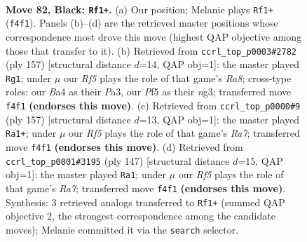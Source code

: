 \documentclass[11pt]{article}
\begin{document}
\clearpage

\begin{figure}[p]\centering
\begin{subfigure}{0.46\textwidth}\centering
\resizebox{\linewidth}{!}{%
\newchessgame
\chessboard[
  setfen={7R/P4k2/8/5p2/b4r2/8/8/7K b - - 0 82},
  showmover=false,
  pgfstyle=straightmove, color=movearrow, markmove={f4-f1}
]}
\caption{}
\end{subfigure}\hfill
\begin{subfigure}{0.46\textwidth}\centering
\resizebox{\linewidth}{!}{%
\newchessgame
\chessboard[
  setfen={1R6/4k3/8/7K/8/p5N1/8/r7 b - - 8 79},
  showmover=false,
  pgfstyle=straightmove, color=movearrow, markmove={a1-g1}
]}
\caption{}
\end{subfigure}
\\[4pt]
\begin{subfigure}{0.46\textwidth}\centering
\resizebox{\linewidth}{!}{%
\newchessgame
\chessboard[
  setfen={8/3k4/8/p7/8/6RP/r7/6K1 b - - 2 79},
  showmover=false,
  pgfstyle=straightmove, color=movearrow, markmove={a2-a1}
]}
\caption{}
\end{subfigure}\hfill
\begin{subfigure}{0.46\textwidth}\centering
\resizebox{\linewidth}{!}{%
\newchessgame
\chessboard[
  setfen={8/8/8/1k4K1/4P1R1/p7/r7/8 b - - 0 74},
  showmover=false,
  pgfstyle=straightmove, color=movearrow, markmove={a2-a1}
]}
\caption{}
\end{subfigure}
\caption{\textbf{Move 82, Black: \texttt{Rf1+}.} (a) Our position; Melanie plays \texttt{Rf1+} (\texttt{f4f1}). Panels (b)--(d) are the retrieved master positions whose correspondence most drove this move (highest QAP objective among those that transfer to it). (b) Retrieved from \texttt{ccrl\_top\_p0003\#2782} (ply 157) [structural distance $d$=14, QAP obj=1]: the master played \texttt{Rg1}; under $\mu$ our \emph{Rf5} plays the role of that game's \emph{Ra8}; cross-type roles: our \emph{B}a4 as their \emph{P}a3, our \emph{P}f5 as their \emph{n}g3; transferred move \texttt{f4f1} \textbf{(endorses this move)}. (c) Retrieved from \texttt{ccrl\_top\_p0000\#9} (ply 157) [structural distance $d$=13, QAP obj=1]: the master played \texttt{Ra1+}; under $\mu$ our \emph{Rf5} plays the role of that game's \emph{Ra7}; transferred move \texttt{f4f1} \textbf{(endorses this move)}. (d) Retrieved from \texttt{ccrl\_top\_p0001\#3195} (ply 147) [structural distance $d$=15, QAP obj=1]: the master played \texttt{Ra1}; under $\mu$ our \emph{Rf5} plays the role of that game's \emph{Ra7}; transferred move \texttt{f4f1} \textbf{(endorses this move)}. Synthesis: 3 retrieved analogs transferred to \texttt{Rf1+} (summed QAP objective 2, the strongest correspondence among the candidate moves); Melanie committed it via the \texttt{search} selector.}
\label{fig:thought-m163}
\end{figure}
\end{document}
